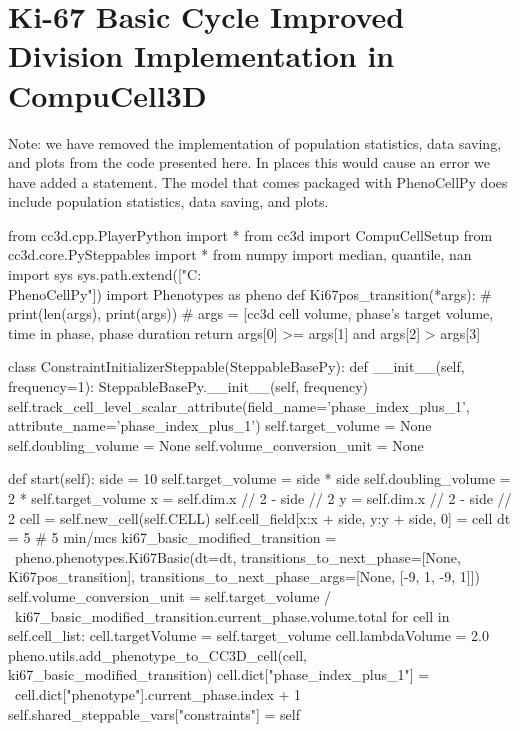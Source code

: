 \section{Ki-67 Basic Cycle Improved Division Implementation in CompuCell3D}\label{suplemental:cc3d-ex:ki67-improved}
Note: we have removed the implementation of population statistics, data saving, and plots from the code presented here. In places this would cause an error we have added a  statement. The model that comes packaged with PhenoCellPy does include population statistics, data saving, and plots.


\begin{python}
from cc3d.cpp.PlayerPython import *
from cc3d import CompuCellSetup
from cc3d.core.PySteppables import *
from numpy import median, quantile, nan
import sys
sys.path.extend(["C:\\PhenoCellPy"])
import Phenotypes as pheno
def Ki67pos_transition(*args):
    # print(len(args), print(args))
    # args = [cc3d cell volume, phase's target volume, time in phase, phase duration
    return args[0] >= args[1] and args[2] > args[3]

class ConstraintInitializerSteppable(SteppableBasePy):
    def __init__(self, frequency=1):
        SteppableBasePy.__init__(self, frequency)
        self.track_cell_level_scalar_attribute(field_name='phase_index_plus_1', attribute_name='phase_index_plus_1')
        self.target_volume = None
        self.doubling_volume = None
        self.volume_conversion_unit = None

    def start(self):
        side = 10
        self.target_volume = side * side
        self.doubling_volume = 2 * self.target_volume
        x = self.dim.x // 2 - side // 2
        y = self.dim.x // 2 - side // 2
        cell = self.new_cell(self.CELL)
        self.cell_field[x:x + side, y:y + side, 0] = cell
        dt = 5  # 5 min/mcs
        ki67_basic_modified_transition = \ 
            pheno.phenotypes.Ki67Basic(dt=dt,
                transitions_to_next_phase=[None,
                    Ki67pos_transition],
                transitions_to_next_phase_args=[None,
                    [-9, 1, -9, 1]])
        self.volume_conversion_unit = self.target_volume / \
            ki67_basic_modified_transition.current_phase.volume.total
        for cell in self.cell_list:
            cell.targetVolume = self.target_volume
            cell.lambdaVolume = 2.0
            pheno.utils.add_phenotype_to_CC3D_cell(cell, 
                ki67_basic_modified_transition)
            cell.dict["phase_index_plus_1"] = \
                cell.dict["phenotype"].current_phase.index + 1
        self.shared_steppable_vars["constraints"] = self
        

\end{python}

